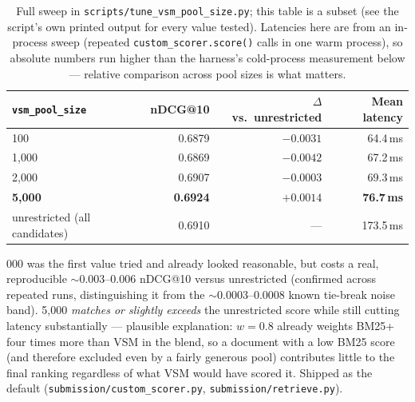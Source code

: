 \documentclass[11pt]{article}
\begin{document}
\begin{table}[h]
\centering
\begin{tabular}{lrrr}
\toprule
\texttt{vsm\_pool\_size} & nDCG@10 & $\Delta$ vs.\ unrestricted & Mean latency \\
\midrule
100 & 0.6879 & $-0.0031$ & 64.4\,ms \\
1{,}000 & 0.6869 & $-0.0042$ & 67.2\,ms \\
2{,}000 & 0.6907 & $-0.0003$ & 69.3\,ms \\
\textbf{5{,}000} & \textbf{0.6924} & \textbf{$+0.0014$} & \textbf{76.7\,ms} \\
unrestricted (all candidates) & 0.6910 & --- & 173.5\,ms \\
\bottomrule
\end{tabular}
\caption{Full sweep in \texttt{scripts/tune\_vsm\_pool\_size.py}; this
table is a subset (see the script's own printed output for every value
tested). Latencies here are from an in-process sweep (repeated
\texttt{custom\_scorer.score()} calls in one warm process), so absolute
numbers run higher than the harness's cold-process measurement below ---
relative comparison across pool sizes is what matters.}
\end{table}

000 was the first value tried and already looked
reasonable, but costs a real, reproducible $\sim$0.003--0.006 nDCG@10 versus
unrestricted (confirmed across repeated runs, distinguishing it from the
$\sim$0.0003--0.0008 known tie-break noise band). 5{,}000 \emph{matches or
slightly exceeds} the unrestricted score while still cutting latency
substantially --- plausible explanation: $w{=}0.8$ already weights
BM25+ four times more than VSM in the blend, so a document with a low
BM25 score (and therefore excluded even by a fairly generous pool)
contributes little to the final ranking regardless of what VSM would
have scored it. Shipped as the default
(\texttt{submission/custom\_scorer.py}, \texttt{submission/retrieve.py}).
\end{document}

